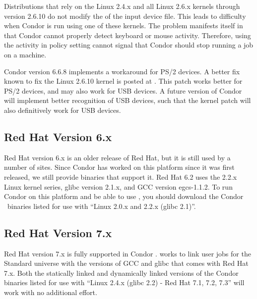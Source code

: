 Distributions that rely on the Linux 2.4.x and all Linux 2.6.x kernels
through version 2.6.10
do not modify the  of the input device file.
This leads to difficulty when Condor is run using one of these
kernels. 
The problem manifests itself in that Condor cannot properly
detect keyboard or mouse activity.
Therefore, using the activity in policy setting cannot
signal that Condor should stop running a job on a machine.

Condor version 6.6.8 implements a workaround for PS/2 devices.
A better fix known to fix the Linux 2.6.10 kernel is
posted at .
This patch works better for PS/2 devices, and
may also work for USB devices.
A future version of Condor will implement better recognition
of USB devices,
such that the kernel patch will also definitively work for USB devices.

\subsection{\label{sec:platform-linux-rh6}Red Hat Version 6.x}

Red Hat version 6.x is an older release of Red Hat, but it is still used
by a number of sites.
Since Condor has worked on this platform since it was first released,
we still provide binaries that support it.
Red Hat 6.2 uses the 2.2.x Linux kernel series, glibc version 2.1.x,
and GCC version egcs-1.1.2.
To run Condor on this platform and be able to use ,
you should download the Condor \VersionNotice\  binaries listed for use
with ``Linux 2.0.x and 2.2.x (glibc 2.1)''.


\subsection{\label{sec:platform-linux-rh7}Red Hat Version 7.x}

Red Hat version 7.x is fully supported in Condor \VersionNotice.
 works to link user jobs for the Standard universe
with the versions of GCC and glibc that comes with Red Hat 7.x.
Both the statically linked and dynamically linked versions of the
Condor binaries listed for use with ``Linux 2.4.x (glibc 2.2) - Red Hat
7.1, 7.2, 7.3'' will work with no additional effort.


